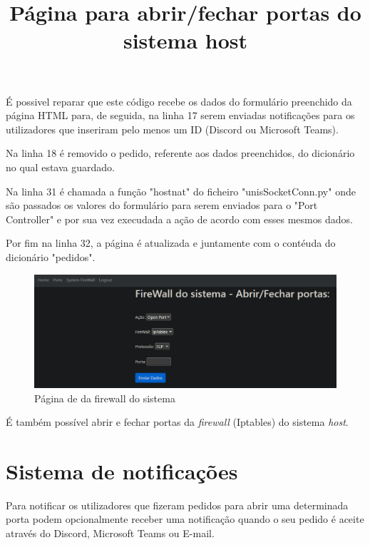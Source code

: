 É possivel reparar que este código recebe os dados do formulário preenchido da página HTML
para, de seguida, na linha 17 serem enviadas notificações para os utilizadores que inseriram
pelo menos um ID (Discord ou Microsoft Teams).

Na linha 18 é removido o pedido, referente aos dados preenchidos, do dicionário no qual estava guardado.

Na linha 31 é chamada a função "hostnat" do ficheiro "unisSocketConn.py" onde são passados 
os valores do formulário para serem enviados para o "Port Controller" e por sua vez execudada
a ação de acordo com esses mesmos dados.

Por fim na linha 32, a página é atualizada e juntamente com o contéuda do dicionário "pedidos".





\title*{\textbf{Página para abrir/fechar portas do sistema host}}

\begin{figure}[H]
\begin{center}
\includegraphics[width=16cm]{figs/sysfirewall.png}
\caption{Página de da firewall do sistema}
\label{fig:bookstack}
\end{center}
\end{figure}

É também possível abrir e fechar portas da \textit{firewall} (Iptables) 
do sistema \textit{host}.









\section{Sistema de notificações}

Para notificar os utilizadores que fizeram pedidos para abrir uma determinada
porta podem opcionalmente receber uma notificação quando o seu pedido é aceite 
através do Discord, Microsoft Teams ou E-mail.

